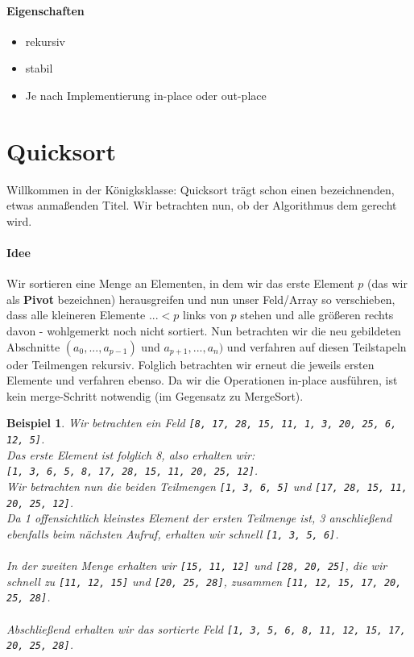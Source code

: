 \documentclass[11pt,a4paper]{scrartcl}
\newtheorem{example}{Beispiel}
\begin{document}
\paragraph{Eigenschaften}
\begin{itemize}
\item rekursiv
\item stabil
\item Je nach Implementierung in-place oder out-place
\end{itemize}
\section{Quicksort}
Willkommen in der Königksklasse: Quicksort trägt schon einen bezeichnenden, etwas anmaßenden Titel. Wir betrachten nun, ob der Algorithmus dem gerecht wird.
\paragraph{Idee}
Wir sortieren eine Menge an Elementen, in dem wir das erste Element $p$ (das wir als \textbf{Pivot} bezeichnen) herausgreifen und nun unser Feld/Array so verschieben, dass alle kleineren Elemente ${...} < p$ links von $p$ stehen und alle größeren rechts davon - wohlgemerkt noch nicht sortiert. Nun betrachten wir die neu gebildeten Abschnitte $(a_{0}, ..., a_{p-1})$ und $a_{p+1}, ..., a_{n})$ und verfahren auf diesen Teilstapeln oder Teilmengen rekursiv. Folglich betrachten wir erneut die jeweils ersten Elemente und verfahren ebenso. Da wir die Operationen in-place ausführen, ist kein merge-Schritt notwendig (im Gegensatz zu MergeSort).
\begin{example} Wir betrachten ein Feld \texttt{[8, 17, 28, 15, 11, 1, 3, 20, 25, 6, 12, 5]}. \\
Das erste Element ist folglich 8, also erhalten wir: \\
\texttt{[1, 3, 6, 5, 8, 17, 28, 15, 11, 20, 25, 12]}.\\
Wir betrachten nun die beiden Teilmengen \texttt{[1, 3, 6, 5]} und \texttt{[17, 28, 15, 11, 20, 25, 12]}. \\
Da 1 offensichtlich kleinstes Element der ersten Teilmenge ist, 3 anschließend ebenfalls beim nächsten Aufruf, erhalten wir schnell \texttt{[1, 3, 5, 6]}. \\\\
In der zweiten Menge erhalten wir \texttt{[15, 11, 12]} und \texttt{[28, 20, 25]}, die wir schnell zu \texttt{[11, 12, 15]} und \texttt{[20, 25, 28]}, zusammen \texttt{[11, 12, 15, 17, 20, 25, 28]}. \\\\
Abschließend erhalten wir das sortierte Feld \texttt{[1, 3, 5, 6, 8, 11, 12, 15, 17, 20, 25, 28]}.
\end{example}
\end{document}
